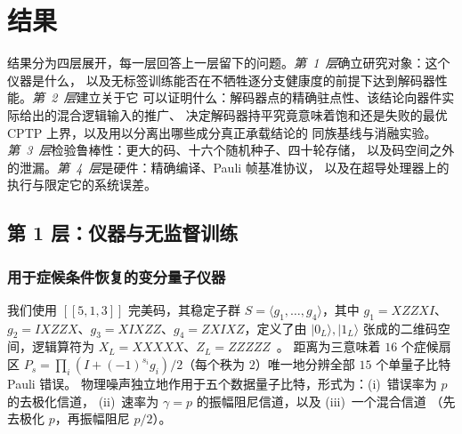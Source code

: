 \documentclass[11pt,a4paper]{article}
\newcommand{\ket}[1]{\lvert #1\rangle}
\newcommand{\code}{[\![5,1,3]\!]}
\begin{document}
\section*{结果}

结果分为四层展开，每一层回答上一层留下的问题。\emph{第~1~层}确立研究对象：这个仪器是什么，
以及无标签训练能否在不牺牲逐分支健康度的前提下达到解码器性能。\emph{第~2~层}建立关于它
可以证明什么：解码器点的精确驻点性、该结论向器件实际给出的混合逻辑输入的推广、
决定解码器持平究竟意味着饱和还是失败的最优 CPTP 上界，以及用以分离出哪些成分真正承载结论的
同族基线与消融实验。\emph{第~3~层}检验鲁棒性：更大的码、十六个随机种子、四十轮存储，
以及码空间之外的泄漏。\emph{第~4~层}是硬件：精确编译、Pauli 帧基准协议，
以及在超导处理器上的执行与限定它的系统误差。

\subsection*{第 1 层：仪器与无监督训练}

\subsubsection*{用于症候条件恢复的变分量子仪器}

我们使用 $\code$ 完美码，其稳定子群
$S=\langle g_1,\dots,g_4\rangle$，其中
$g_1=XZZXI$、$g_2=IXZZX$、$g_3=XIXZZ$、$g_4=ZXIXZ$，定义了由 $\ket{0_L},\ket{1_L}$
张成的二维码空间，逻辑算符为 $X_L=XXXXX$、$Z_L=ZZZZZ$~\cite{laflamme_5q,gottesman_hamming}。
距离为三意味着 $16$ 个症候扇区
$P_s=\prod_i (I+(-1)^{s_i}g_i)/2$（每个秩为 $2$）唯一地分辨全部 $15$ 个单量子比特 Pauli 错误。
物理噪声独立地作用于五个数据量子比特，形式为：(i)~错误率为 $p$ 的去极化信道，
(ii)~速率为 $\gamma=p$ 的振幅阻尼信道，以及 (iii)~一个混合信道
（先去极化 $p$，再振幅阻尼 $p/2$）。
\end{document}

